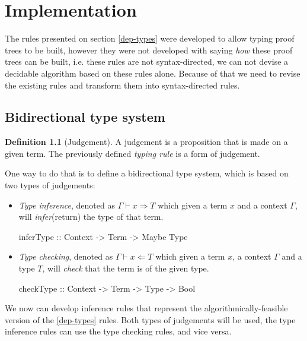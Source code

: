\documentclass[
       embeddedlogo,
       english,
       lmodern,
       coorientadorbanca,
       noabntexcite
]{ufsc-thesis-rn46-2019}
\theoremstyle{definition}
\newtheorem{definition}{Definition}[section]
\newcommand{\infers}{\Rightarrow}
\newcommand{\checks}{\Leftarrow}
\begin{document}
\chapter{Implementation}

The rules presented on section \ref{dep-types} were developed to allow typing proof trees to be built, however they were not developed with saying \emph{how} these proof trees can be built, i.e. these rules are not syntax-directed, we can not devise a decidable algorithm based on these rules alone.
Because of that we need to revise the existing rules and transform them into syntax-directed rules.

\section{Bidirectional type system}

\begin{definition}[Judgement]
       A judgement is a proposition that is made on a given term. The previously defined \emph{typing rule} is a form of judgement.\cite{nlab:judgment}
\end{definition}

One way to do that is to define a bidirectional type system, which is based on two types of judgements:
\begin{itemize}
       \item \emph{Type inference}, denoted as $\Gamma \vdash x \infers T$ which given a term $x$ and a context $\Gamma$, will \emph{infer}(return) the type of that term.
             \begin{haskell}
                    inferType :: Context -> Term -> Maybe Type
             \end{haskell}
       \item \emph{Type checking}, denoted as $\Gamma \vdash x \checks T$ which given a term $x$, a context $\Gamma$ and a type $T$, will \emph{check} that the term is of the given type.
             \begin{haskell}
                    checkType :: Context -> Term -> Type -> Bool
             \end{haskell}
\end{itemize}

We now can develop inference rules that represent the algorithmically-feasible version of the \ref{dep-types} rules. Both types of judgements will be used, the type inference rules can use the type checking rules, and vice versa.
\end{document}
